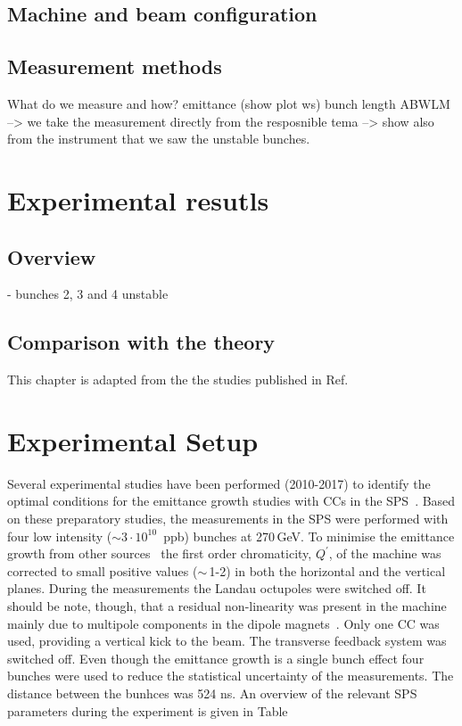 \subsection{Machine and beam configuration}
\subsection{Measurement methods}
 What do we measure and how? emittance (show plot ws)
 bunch length ABWLM --> we take the measurement directly from the resposnible tema
 --> show also from the instrument that we saw the unstable bunches.

 \section{Experimental resutls}
 \subsection{Overview}
 - bunches 2, 3 and 4 unstable
 \subsection{Comparison with the theory}

 \newpage 
 This chapter is adapted from the the studies published in Ref.~\cite{Triantafyllou}

 \section{Experimental Setup} %

Several experimental studies have been performed (2010-2017) to identify the optimal conditions for the emittance growth studies with CCs in the SPS~\cite{Calaga:1451286, Antoniou:2649815}. Based on these preparatory studies, the measurements in the SPS were performed with four low intensity ($\sim 3 \cdot 10^{10}$\, ppb) bunches at 270\,GeV. To minimise the emittance growth from other sources~\cite{Antoniou:2649815} the first order chromaticity, $Q^\prime$, of the machine was corrected to small positive values ($\sim$\,1-2) in both the horizontal and the vertical planes. During the measurements the Landau octupoles were switched off. It should be note, though, that a residual non-linearity was present in the machine mainly due to multipole components in the dipole magnets~\cite{Carlà:2664976, Alekou:2640326}. Only one CC was used, providing a vertical kick to the beam. The transverse feedback system was switched off. Even though the emittance growth is a single bunch effect four bunches were used to reduce the statistical uncertainty of the measurements. The distance between the bunhces was 524 ns. An overview of the relevant SPS parameters during the experiment is given in Table%


